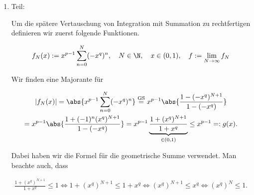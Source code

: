 \begin{solution}

\phantom{}

\begin{enumerate}[label = \arabic*.]

    \item Teil:

    Um die spätere Vertauschung von Integration mit Summation zu rechtfertigen definieren wir zuerst folgende Funktionen.

    \begin{align*}
        f_N(x)
        :=
        x^{p-1}
        \sum_{n=0}^N
        (-x^q)^n,
        \quad
        N \in \N,
        \quad
        x \in (0, 1),
        \quad
        f
        :=
        \lim_{N \to \infty}
        f_N
    \end{align*}

    Wir finden eine Majorante für

    \begin{multline*}
        |f_N(x)|
        =
        \abs
        {
            x^{p-1}
            \sum_{n=0}^N
            (-x^q)^n    
        }
        \stackrel
        {
            \mathrm{GS}
        }{=}
        x^{p-1}
        \abs
        {
            \frac
            {
                1 - (-x^q)^{N+1}
            }{
                1 - (-x^q)
            }    
        } \\
        =
        x^{p-1}
        \abs
        {
            \frac
            {
                1 + (-1)^n (x^q)^{N+1}
            }{
                1 - (-x^q)
            }
        }
        =
        x^{p-1}
        \underbrace
        {
            \frac
            {
                1 + (x^q)^{N+1}
            }{
                1 + x^q
            }    
        }_{
            \in (0, 1)
        }
        \leq
        x^{p-1}
        =:
        g(x).
    \end{multline*}
    
    Dabei haben wir die Formel für die geometrische Summe verwendet.
    Man beachte auch, dass

    \begin{align*}
        \frac
        {
            1 + (x^q)^{N+1}
        }{
            1 + x^q
        }    
        \leq
        1
        \iff
        1 + (x^q)^{N+1}
        \leq
        1 + x^q
        \iff
        (x^q)^{N+1}
        \leq
        x^q
        \iff
        (x^q)^N
        \leq
        1.
    \end{align*}


\end{enumerate}
\end{solution}
